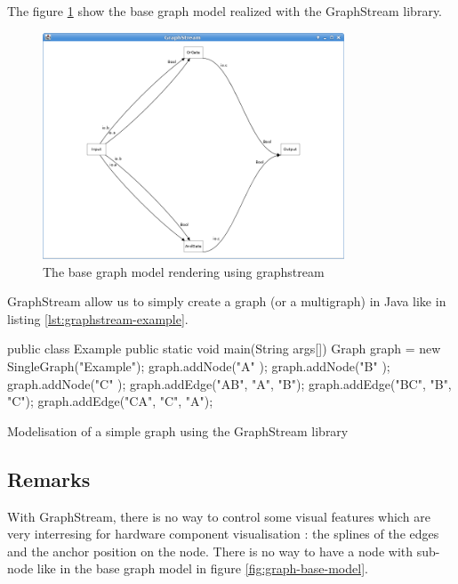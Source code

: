 The figure \ref{fig:base-graph-model-graphstream} show the base graph model
realized with the GraphStream library.

\begin{figure}[h]
  \centering
  \includegraphics[width=0.8\textwidth]{img/graphstream-base-model-example}
  \caption{The base graph model rendering using graphstream}
  \label{fig:base-graph-model-graphstream}
\end{figure}

GraphStream allow us to simply create a graph (or a multigraph) in Java like in
listing \ref{lst:graphstream-example}.

\begin{listing}[p]
  \centering
  \begin{javacode}
    public class Example
    {
      public static void main(String args[])
      {
        Graph graph = new SingleGraph("Example");
        graph.addNode("A" );
        graph.addNode("B" );
        graph.addNode("C" );
        graph.addEdge("AB", "A", "B");
        graph.addEdge("BC", "B", "C");
        graph.addEdge("CA", "C", "A");
      }
    }
  \end{javacode}
  \caption[A simple graph modelisation using GraphStream]{Modelisation of a
    simple graph using the GraphStream library}
  \label{lst:graphstream-example}
\end{listing}


\subsection{Remarks}
\label{sub:Remarks}

With GraphStream, there is no way to control some visual features which are very
interresing for hardware component visualisation : the splines of the edges and
the anchor position on the node. There is no way to have a node with sub-node
like in the base graph model in figure \ref{fig:graph-base-model}.


